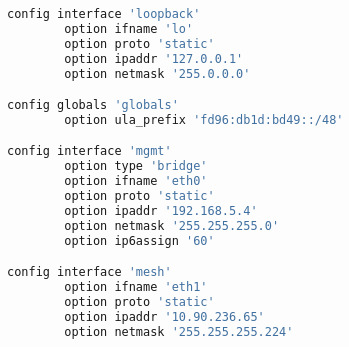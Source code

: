 \begin{lstlisting}[language=bash, caption={Network}]
config interface 'loopback'
        option ifname 'lo'
        option proto 'static'
        option ipaddr '127.0.0.1'
        option netmask '255.0.0.0'

config globals 'globals'
        option ula_prefix 'fd96:db1d:bd49::/48'

config interface 'mgmt'
        option type 'bridge'
        option ifname 'eth0'
        option proto 'static'
        option ipaddr '192.168.5.4'
        option netmask '255.255.255.0'
        option ip6assign '60'

config interface 'mesh'
        option ifname 'eth1'
        option proto 'static'
        option ipaddr '10.90.236.65'
        option netmask '255.255.255.224'
\end{lstlisting}